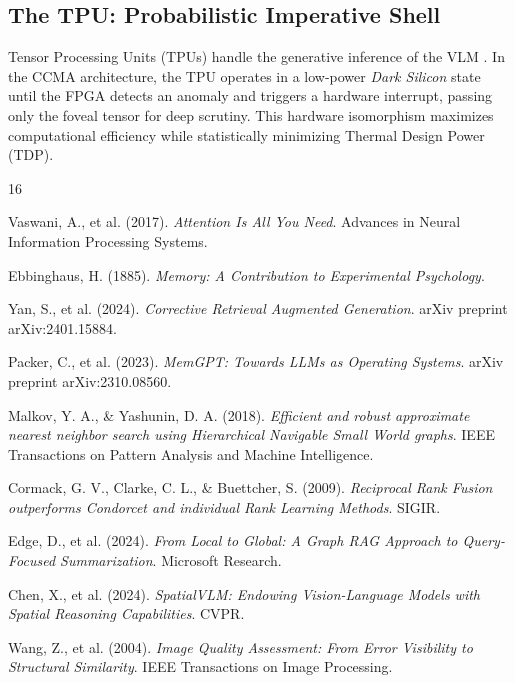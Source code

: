 \documentclass[11pt, a4paper]{article}
\begin{document}
	\subsection{The TPU: Probabilistic Imperative Shell}
	Tensor Processing Units (TPUs) handle the generative inference of the VLM \cite{jouppi2017datacenter}. In the CCMA architecture, the TPU operates in a low-power \textit{Dark Silicon} state until the FPGA detects an anomaly and triggers a hardware interrupt, passing only the foveal tensor for deep scrutiny. This hardware isomorphism maximizes computational efficiency while statistically minimizing Thermal Design Power (TDP).
	
	\begin{thebibliography}{16}
		
		Vaswani, A., et al. (2017). \textit{Attention Is All You Need}. Advances in Neural Information Processing Systems.
		
		Ebbinghaus, H. (1885). \textit{Memory: A Contribution to Experimental Psychology}. 

		Yan, S., et al. (2024). \textit{Corrective Retrieval Augmented Generation}. arXiv preprint arXiv:2401.15884.
		
		Packer, C., et al. (2023). \textit{MemGPT: Towards LLMs as Operating Systems}. arXiv preprint arXiv:2310.08560.
		
		Malkov, Y. A., \& Yashunin, D. A. (2018). \textit{Efficient and robust approximate nearest neighbor search using Hierarchical Navigable Small World graphs}. IEEE Transactions on Pattern Analysis and Machine Intelligence.
		
		Cormack, G. V., Clarke, C. L., \& Buettcher, S. (2009). \textit{Reciprocal Rank Fusion outperforms Condorcet and individual Rank Learning Methods}. SIGIR.
		
		Edge, D., et al. (2024). \textit{From Local to Global: A Graph RAG Approach to Query-Focused Summarization}. Microsoft Research.
		
		Chen, X., et al. (2024). \textit{SpatialVLM: Endowing Vision-Language Models with Spatial Reasoning Capabilities}. CVPR.
		
		Wang, Z., et al. (2004). \textit{Image Quality Assessment: From Error Visibility to Structural Similarity}. IEEE Transactions on Image Processing.
		

\end{thebibliography}
\end{document}
